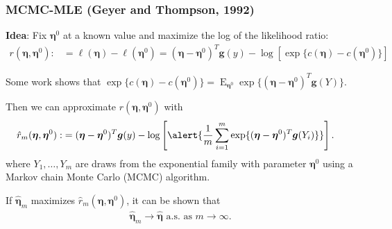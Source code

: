 \documentclass[ 10pt]{beamer}
\DeclareMathOperator{\E}{E}
\def\etabf{{\boldsymbol{\eta}}}
\def\gbf{{\boldsymbol{g}}}
\begin{document}
\frame
{
  \frametitle{MCMC-MLE (Geyer and Thompson, 1992) }

\textbf{Idea}: Fix $\etabf^0$ at a known value and maximize the log of the likelihood ratio:
\begin{align*}
r( \etabf, \etabf^0 ) :&= \ell( \etabf ) - \ell( \etabf^0 )
					= ( \etabf - \etabf^0)^T \gbf(y) - \log \left [ \exp \{ c(\etabf) - c(\etabf^0) \} \right ]
\end{align*}


Some work shows that $\exp \{ c(\etabf) - c(\etabf^0)\} = \E_{\etabf^0} \exp \{ ( \etabf - \etabf^0)^T\gbf(Y)\}$.  
\vspace*{2mm} 

Then we can approximate $r( \etabf, \etabf^0 )$ with
\begin{align*}
\hat{r}_m( \etabf, \etabf^0 ) :&= ( \etabf - \etabf^0)^T\gbf(y) - \log \left [ \alert{ \frac{1}{m} \sum_{i=1}^{m} \exp \{ ( \etabf - \etabf^0)^T\gbf(Y_i)\} } \right ].
\end{align*}
where $Y_1, \ldots, Y_m$ are draws from the exponential family with parameter $\etabf^0$ using a Markov chain Monte Carlo (MCMC) algorithm.
\vspace*{2mm} 

If $\hat{\etabf}_m$ maximizes $\hat{r}_m( \etabf, \etabf^0 )$, it can be shown that 
\begin{align*}
	\hat{\etabf}_m \to \hat{\etabf} \text{ a.s. as $m \to \infty$}.
\end{align*}

}  
\setcounter{framenumber}{\value{finalframe}}
\end{document}
